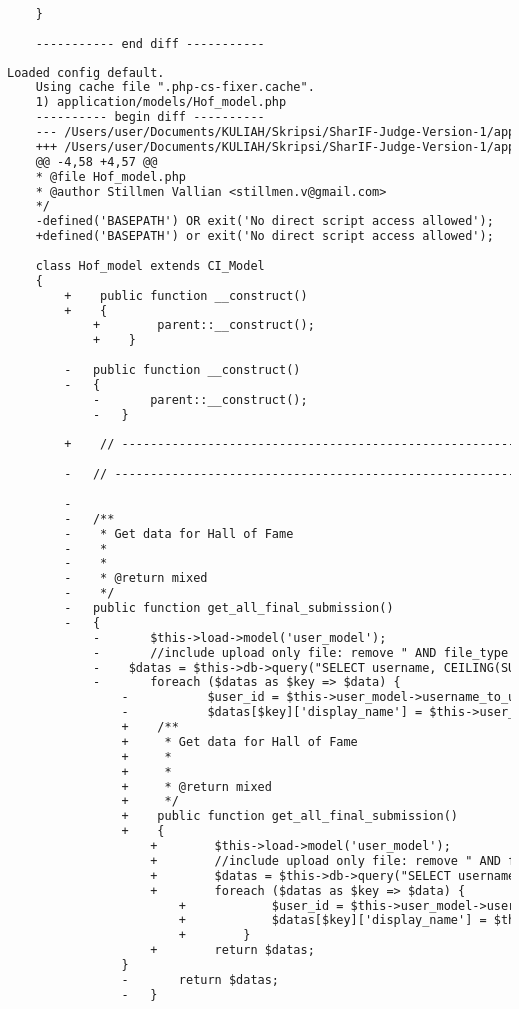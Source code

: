 \begin{lstlisting}[language=diff, caption=Perubahan pada kode Assignment\_model.php]
		
	}
	
	----------- end diff -----------
\end{lstlisting}

\begin{lstlisting}[language=diff, caption=Perubahan pada kode Hof\_model.php]
	Loaded config default.
	Using cache file ".php-cs-fixer.cache".
	1) application/models/Hof_model.php
	---------- begin diff ----------
	--- /Users/user/Documents/KULIAH/Skripsi/SharIF-Judge-Version-1/application/models/Hof_model.php
	+++ /Users/user/Documents/KULIAH/Skripsi/SharIF-Judge-Version-1/application/models/Hof_model.php
	@@ -4,58 +4,57 @@
	* @file Hof_model.php
	* @author Stillmen Vallian <stillmen.v@gmail.com>
	*/
	-defined('BASEPATH') OR exit('No direct script access allowed');
	+defined('BASEPATH') or exit('No direct script access allowed');
	
	class Hof_model extends CI_Model
	{
		+    public function __construct()
		+    {
			+        parent::__construct();
			+    }
		
		-	public function __construct()
		-	{
			-		parent::__construct();
			-	}
		
		+    // ------------------------------------------------------------------------
		
		-	// ------------------------------------------------------------------------
		
		-
		-	/**
		-	 * Get data for Hall of Fame
		-	 *
		-	 *
		-	 * @return mixed
		-	 */
		-	public function get_all_final_submission()
		-	{
			-		$this->load->model('user_model');
			-		//include upload only file: remove " AND file_type!='txt' AND file_type!='pdf' AND file_type!='zip' ";
			-    $datas = $this->db->query("SELECT username, CEILING(SUM(pre_score * coefficient / 10000))  AS totalscore FROM shj_submissions WHERE is_final=1 AND file_type!='txt' AND file_type!='pdf' AND file_type!='zip' GROUP BY username ORDER BY totalscore DESC")->result_array();
			-		foreach ($datas as $key => $data) {
				-			$user_id = $this->user_model->username_to_user_id($data['username']);
				-			$datas[$key]['display_name'] = $this->user_model->get_user($user_id)->display_name;
				+    /**
				+     * Get data for Hall of Fame
				+     *
				+     *
				+     * @return mixed
				+     */
				+    public function get_all_final_submission()
				+    {
					+        $this->load->model('user_model');
					+        //include upload only file: remove " AND file_type!='txt' AND file_type!='pdf' AND file_type!='zip' ";
					+        $datas = $this->db->query("SELECT username, CEILING(SUM(pre_score * coefficient / 10000))  AS totalscore FROM shj_submissions WHERE is_final=1 AND file_type!='txt' AND file_type!='pdf' AND file_type!='zip' GROUP BY username ORDER BY totalscore DESC")->result_array();
					+        foreach ($datas as $key => $data) {
						+            $user_id = $this->user_model->username_to_user_id($data['username']);
						+            $datas[$key]['display_name'] = $this->user_model->get_user($user_id)->display_name;
						+        }
					+        return $datas;
				}
				-		return $datas;
				-	}
			

\end{lstlisting}
